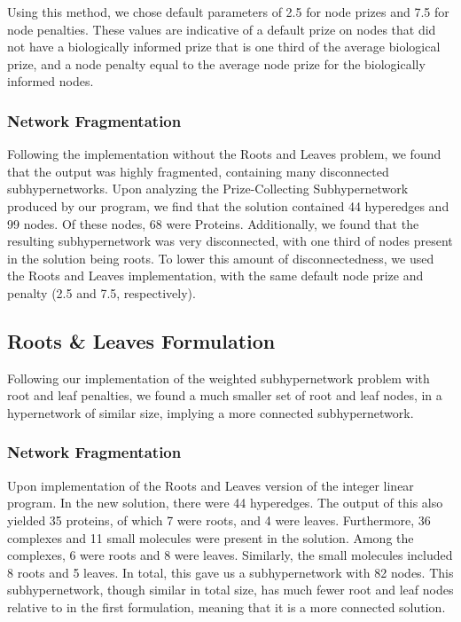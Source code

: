 \documentclass[12pt,twoside]{reedthesis}
\theoremstyle{definition}
\begin{document}
   Using this method, we chose default parameters of 2.5 for node prizes and 7.5 for node penalties. These values are indicative of a default prize on nodes that did not have a biologically informed prize that is one third of the average biological prize, and a node penalty equal to the average node prize for the biologically informed nodes.\par

   \subsubsection{Network Fragmentation}

   Following the implementation without the Roots and Leaves problem, we found that the output was highly fragmented, containing many disconnected subhypernetworks. Upon analyzing the Prize-Collecting Subhypernetwork produced by our program, we find that the solution contained 44 hyperedges and 99 nodes. Of these nodes, 68 were Proteins. Additionally, we found that the resulting subhypernetwork was very disconnected, with one third of nodes present in the solution being roots. To lower this amount of disconnectedness, we used the Roots and Leaves implementation, with the same default node prize and penalty (2.5 and 7.5, respectively). \par

   \subsection{Roots \& Leaves Formulation}

   Following our implementation of the weighted subhypernetwork problem with root and leaf penalties, we found a much smaller set of root and leaf nodes, in a hypernetwork of similar size, implying a more connected subhypernetwork.\par

   \subsubsection{Network Fragmentation}

   Upon implementation of the Roots and Leaves version of the integer linear program. In the new solution, there were 44 hyperedges. The output of this also yielded 35 proteins, of which 7 were roots, and 4 were leaves. Furthermore, 36 complexes and 11 small molecules were present in the solution. Among the complexes, 6 were roots and 8 were leaves. Similarly, the small molecules included 8 roots and 5 leaves. In total, this gave us a subhypernetwork with 82 nodes. This subhypernetwork, though similar in total size, has much fewer root and leaf nodes relative to in the first formulation, meaning that it is a more connected solution.\par
\end{document}
